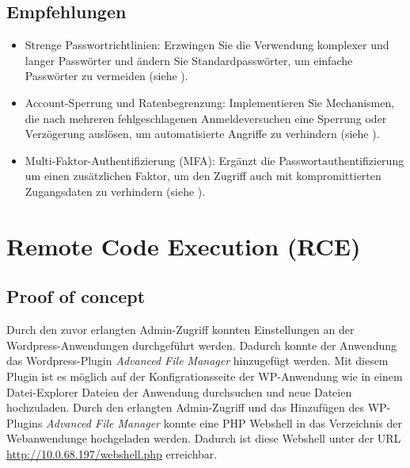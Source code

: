 \subsection*{Empfehlungen}
\begin{itemize}
    \item Strenge Passwortrichtlinien: Erzwingen Sie die Verwendung komplexer und langer Passwörter und ändern Sie Standardpasswörter, um einfache Passwörter zu vermeiden (siehe \cite{bsi_passwords}).
    \item Account-Sperrung und Ratenbegrenzung: Implementieren Sie Mechanismen, die nach mehreren fehlgeschlagenen Anmeldeversuchen eine Sperrung oder Verzögerung auslösen, um automatisierte Angriffe zu verhindern (siehe \cite{owaspAuthenticationOWASP}).
    \item Multi-Faktor-Authentifizierung (MFA): Ergänzt die Passwortauthentifizierung um einen zusätzlichen Faktor, um den Zugriff auch mit kompromittierten Zugangsdaten zu verhindern (siehe \cite{owaspAuthenticationOWASP}).
\end{itemize}


\section{\makecvssbadge Remote Code Execution (RCE)}

\subsection*{Proof of concept}
Durch den zuvor erlangten Admin-Zugriff konnten Einstellungen an der Wordpress-Anwendungen durchgeführt werden. Dadurch konnte der Anwendung das Wordpress-Plugin \textit{Advanced File Manager} hinzugefügt werden. Mit diesem Plugin ist es möglich auf der Konfigrationsseite der WP-Anwendung wie in einem Datei-Explorer Dateien der Anwendung durchsuchen und neue Dateien hochzuladen. Durch den erlangten Admin-Zugriff und das Hinzufügen des WP-Plugins \textit{Advanced File Manager} konnte eine PHP Webshell in das Verzeichnis der Webanwendunge hochgeladen werden. Dadurch ist diese Webshell unter der URL \url{http://10.0.68.197/webshell.php} erreichbar. 


